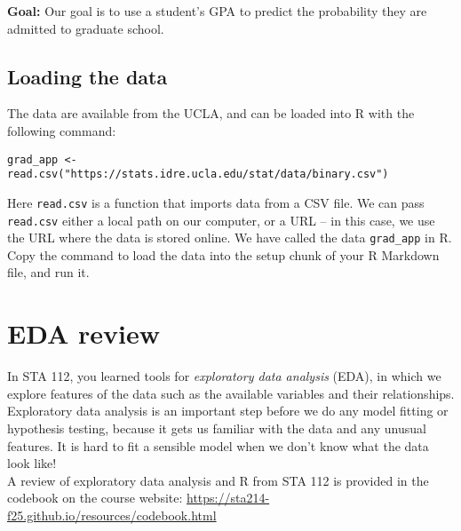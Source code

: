 \documentclass[11pt]{article}
\begin{document}
\noindent \textbf{Goal:} Our goal is to use a student's GPA to predict the probability they are admitted to graduate school.

\subsection*{Loading the data}

The data are available from the UCLA, and can be loaded into R with the following command:

\begin{verbatim}
grad_app <- read.csv("https://stats.idre.ucla.edu/stat/data/binary.csv")
\end{verbatim}

\noindent Here \texttt{read.csv} is a function that imports data from a CSV file. We can pass \texttt{read.csv} either a local path on our computer, or a URL -- in this case, we use the URL where the data is stored online. We have called the data \verb;grad_app; in R.\\

\noindent Copy the command to load the data into the setup chunk of your R Markdown file, and run it.

\newpage

\section{EDA review}

In STA 112, you learned tools for \textit{exploratory data analysis} (EDA), in which we explore features of the data such as the available variables and their relationships. Exploratory data analysis is an important step before we do any model fitting or hypothesis testing, because it gets us familiar with the data and any unusual features. It is hard to fit a sensible model when we don't know what the data look like!\\

\noindent A review of exploratory data analysis and R from STA 112 is provided in the codebook on the course website: \url{https://sta214-f25.github.io/resources/codebook.html} 
\end{document}

